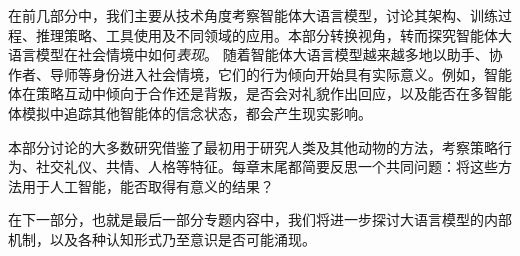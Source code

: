 在前几部分中，我们主要从技术角度考察智能体大语言模型，讨论其架构、训练过程、推理策略、工具使用及不同领域的应用。本部分转换视角，转而探究智能体大语言模型在社会情境中如何\emph{表现}。
随着智能体大语言模型越来越多地以助手、协作者、导师等身份进入社会情境，它们的行为倾向开始具有实际意义。例如，智能体在策略互动中倾向于合作还是背叛，是否会对礼貌作出回应，以及能否在多智能体模拟中追踪其他智能体的信念状态，都会产生现实影响。

本部分讨论的大多数研究借鉴了最初用于研究人类及其他动物的方法，考察策略行为、社交礼仪、共情、人格等特征。每章末尾都简要反思一个共同问题：将这些方法用于人工智能，能否取得有意义的结果？

在下一部分，也就是最后一部分专题内容中，我们将进一步探讨大语言模型的内部机制，以及各种认知形式乃至意识是否可能涌现。
